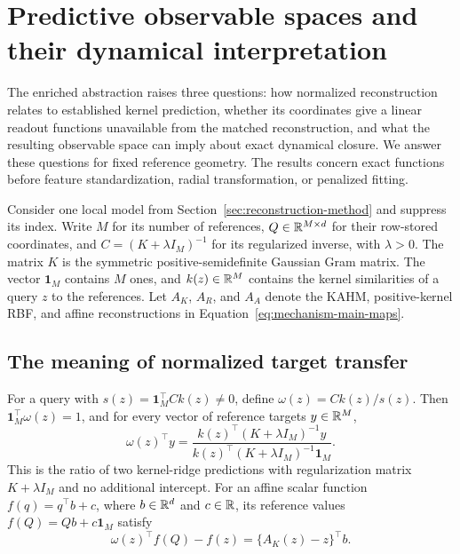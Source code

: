 \section{Predictive observable spaces and their dynamical interpretation}
\label{sec:reconstruction-theory}

The enriched abstraction raises three questions: how normalized
reconstruction relates to established kernel prediction, whether its
coordinates give a linear readout functions unavailable from the matched
reconstruction, and what the resulting observable space can imply about
exact dynamical closure. We answer these questions for fixed reference geometry.
The results concern exact functions before feature standardization,
radial transformation, or penalized fitting.

Consider one local model from Section~\ref{sec:reconstruction-method} and
suppress its index. Write $M$ for its number of references,
$Q\in\mathbb{R}^{M\times d}$ for their row-stored coordinates, and
$C=(K+\lambda I_M)^{-1}$ for its regularized inverse, with $\lambda>0$.
The matrix $K$ is the symmetric positive-semidefinite Gaussian Gram
matrix. The vector $\mathbf1_M$ contains $M$ ones, and $k(z)\in\mathbb{R}^M$
contains the kernel similarities of a query $z$ to the references.
Let $A_K$, $A_R$, and $A_A$ denote the KAHM, positive-kernel RBF, and
affine reconstructions in Equation~\eqref{eq:mechanism-main-maps}.

\subsection{The meaning of normalized target transfer}

\begin{proposition}
\label{prop:mechanism-krr}
For a query with $s(z)=\mathbf1_M^\top Ck(z)\ne0$, define
$\omega(z)=Ck(z)/s(z)$. Then $\mathbf1_M^\top\omega(z)=1$, and for
every vector of reference targets $y\in\mathbb{R}^M$,
\begin{equation}
 \omega(z)^\top y
 =\frac{k(z)^\top(K+\lambda I_M)^{-1}y}
 {k(z)^\top(K+\lambda I_M)^{-1}\mathbf1_M}.
 \label{eq:main-target-transfer}
\end{equation}
This is the ratio of two kernel-ridge predictions with regularization
matrix $K+\lambda I_M$ and no additional intercept. For an affine scalar
function $f(q)=q^\top b+c$, where $b\in\mathbb{R}^d$ and $c\in\mathbb{R}$, its
reference values $f(Q)=Qb+c\mathbf1_M$ satisfy
\[
 \omega(z)^\top f(Q)-f(z)=\{A_K(z)-z\}^\top b.
\]
\end{proposition}

